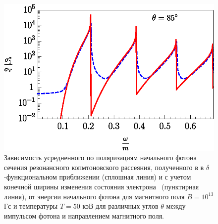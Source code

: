 \documentclass[cp1251%
               ]{jetp} %
\begin{document}
\begin{figure}[t!]
\includegraphics[width=1\linewidth,clip]{fig2_3.eps}
\caption{Зависимость усредненного по поляризациям начального фотона сечения резонансного копмтоновского рассеяния, полученного в в $\delta$-функциональном приближении (сплошная линия) и с учетом конечной ширины изменения состояния электрона~\cite{Harding:1991} (пунктирная линия), от энергии начального фотона для магнитного поля $B = 10^{13}$ Гс и температуры $T=50$ кэВ для различных углов $\theta$ между импульсом фотона и направлением магнитного поля.}
\label{fig2}
\end{figure}
\end{document}
